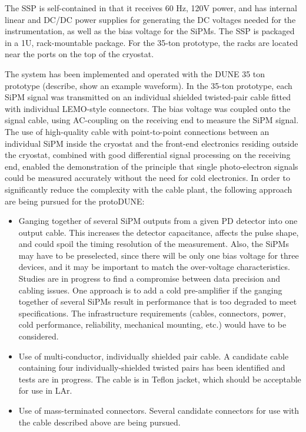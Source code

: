 The SSP is self-contained in that it receives 60 Hz, 120V power, and has internal 
linear and DC/DC power supplies for generating the DC voltages needed for the 
instrumentation, as well as the bias voltage for the SiPMs.  
The SSP is packaged in a 1U, rack-mountable package. For the 35-ton prototype, 
the racks are located near the ports on the top of the cryostat.  

The system has been implemented and operated with the DUNE 35 ton prototype 
(describe, show an example waveform).
%
In the 35-ton prototype, each SiPM signal was transmitted on an individual 
shielded twisted-pair cable fitted with individual LEMO-style connectors.  
The bias voltage was coupled onto the signal cable, using AC-coupling on 
the receiving end to measure the SiPM signal.  
The use of high-quality cable with point-to-point connections between an 
individual SiPM inside the cryostat and the front-end electronics residing 
outside the cryostat, combined with good differential signal processing on 
the receiving end, enabled the demonstration of the principle that single 
photo-electron signals could be measured accurately without the need for 
cold electronics.  
In order to significantly reduce the complexity with the cable plant, 
the following approach are being pursued for the protoDUNE:  
\begin{itemize}
\item Ganging together of several SiPM outputs from a given PD detector 
into one output cable.  
This increases the detector capacitance, affects the pulse shape, and
could spoil the timing resolution of the measurement.  
Also, the SiPMs may have to be preselected, since there will be only one 
bias voltage for three devices, and it may be important to match the 
over-voltage characteristics.  
Studies are in progress to find a compromise between data precision and 
cabling issues. 
One approach is to add a cold pre-amplifier if the ganging together of several 
SiPMs result in performance that is too degraded to meet specifications.  
The infrastructure requirements (cables, connectors, power, cold performance, 
reliability, mechanical mounting, etc.) would have to be considered.

\item Use of multi-conductor, individually shielded pair cable.  
A candidate cable containing four individually-shielded twisted pairs has been 
identified and tests are in progress.  
The cable is in Teflon jacket, which should be acceptable for use in LAr.

\item Use of mass-terminated connectors.  
Several candidate connectors for use with the cable described above are being pursued.
\end{itemize}

